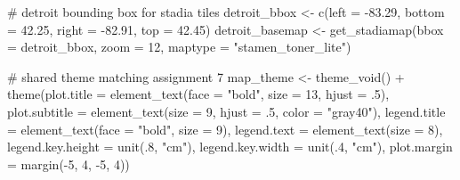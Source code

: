 \documentclass[
  11pt,
]{article}
\newenvironment{Shaded}{\begin{snugshade}}{\end{snugshade}}
\newcommand{\AttributeTok}[1]{\textcolor[rgb]{0.40,0.45,0.13}{#1}}
\newcommand{\CommentTok}[1]{\textcolor[rgb]{0.37,0.37,0.37}{#1}}
\newcommand{\DecValTok}[1]{\textcolor[rgb]{0.68,0.00,0.00}{#1}}
\newcommand{\FloatTok}[1]{\textcolor[rgb]{0.68,0.00,0.00}{#1}}
\newcommand{\FunctionTok}[1]{\textcolor[rgb]{0.28,0.35,0.67}{#1}}
\newcommand{\NormalTok}[1]{\textcolor[rgb]{0.00,0.23,0.31}{#1}}
\newcommand{\OtherTok}[1]{\textcolor[rgb]{0.00,0.23,0.31}{#1}}
\newcommand{\SpecialCharTok}[1]{\textcolor[rgb]{0.37,0.37,0.37}{#1}}
\newcommand{\StringTok}[1]{\textcolor[rgb]{0.13,0.47,0.30}{#1}}
\begin{document}
\begin{Shaded}
\begin{Highlighting}[]
\CommentTok{\# detroit bounding box for stadia tiles}
\NormalTok{detroit\_bbox }\OtherTok{\textless{}{-}} \FunctionTok{c}\NormalTok{(}\AttributeTok{left =} \SpecialCharTok{{-}}\FloatTok{83.29}\NormalTok{, }\AttributeTok{bottom =} \FloatTok{42.25}\NormalTok{, }\AttributeTok{right =} \SpecialCharTok{{-}}\FloatTok{82.91}\NormalTok{, }\AttributeTok{top =} \FloatTok{42.45}\NormalTok{)}
\NormalTok{detroit\_basemap }\OtherTok{\textless{}{-}} \FunctionTok{get\_stadiamap}\NormalTok{(}\AttributeTok{bbox =}\NormalTok{ detroit\_bbox, }\AttributeTok{zoom =} \DecValTok{12}\NormalTok{,}
                                  \AttributeTok{maptype =} \StringTok{"stamen\_toner\_lite"}\NormalTok{)}

\CommentTok{\# shared theme matching assignment 7}
\NormalTok{map\_theme }\OtherTok{\textless{}{-}} \FunctionTok{theme\_void}\NormalTok{() }\SpecialCharTok{+}
  \FunctionTok{theme}\NormalTok{(}\AttributeTok{plot.title =} \FunctionTok{element\_text}\NormalTok{(}\AttributeTok{face =} \StringTok{"bold"}\NormalTok{, }\AttributeTok{size =} \DecValTok{13}\NormalTok{, }\AttributeTok{hjust =}\NormalTok{ .}\DecValTok{5}\NormalTok{),}
        \AttributeTok{plot.subtitle =} \FunctionTok{element\_text}\NormalTok{(}\AttributeTok{size =} \DecValTok{9}\NormalTok{, }\AttributeTok{hjust =}\NormalTok{ .}\DecValTok{5}\NormalTok{, }\AttributeTok{color =} \StringTok{"gray40"}\NormalTok{),}
        \AttributeTok{legend.title =} \FunctionTok{element\_text}\NormalTok{(}\AttributeTok{face =} \StringTok{"bold"}\NormalTok{, }\AttributeTok{size =} \DecValTok{9}\NormalTok{),}
        \AttributeTok{legend.text =} \FunctionTok{element\_text}\NormalTok{(}\AttributeTok{size =} \DecValTok{8}\NormalTok{),}
        \AttributeTok{legend.key.height =} \FunctionTok{unit}\NormalTok{(.}\DecValTok{8}\NormalTok{, }\StringTok{"cm"}\NormalTok{),}
        \AttributeTok{legend.key.width =} \FunctionTok{unit}\NormalTok{(.}\DecValTok{4}\NormalTok{, }\StringTok{"cm"}\NormalTok{),}
        \AttributeTok{plot.margin =} \FunctionTok{margin}\NormalTok{(}\SpecialCharTok{{-}}\DecValTok{5}\NormalTok{, }\DecValTok{4}\NormalTok{, }\SpecialCharTok{{-}}\DecValTok{5}\NormalTok{, }\DecValTok{4}\NormalTok{))}
\end{Highlighting}
\end{Shaded}
\end{document}
